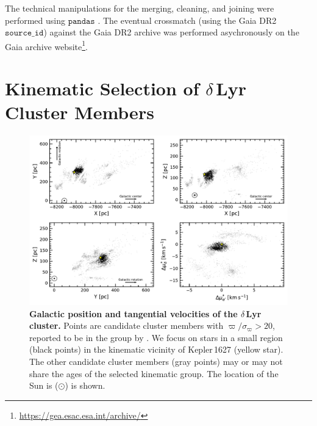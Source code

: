 \documentclass[12pt,modern,twocolumn,tighten]{aastex63}
\begin{document}
The technical manipulations for the merging, cleaning, and joining
were performed using $\texttt{pandas}$
\citep{mckinney-proc-scipy-2010}.  The eventual crossmatch (using the
Gaia DR2 $\texttt{source\_id}$) against the Gaia DR2 archive was performed
asychronously on the Gaia archive
website\footnote{\url{https://gea.esac.esa.int/archive/}}.


\section{Kinematic Selection of $\delta$\,Lyr Cluster Members}
\label{app:kinematicselection}

\begin{figure}[t]
	\begin{center}
		\leavevmode
		\includegraphics[width=1\textwidth]{f1.pdf}
	\end{center}
	\vspace{-0.7cm}
	\caption{
    {\bf Galactic position and tangential velocities of the
    $\delta$\,Lyr cluster.}
    Points are candidate cluster members with $\varpi/\sigma_\varpi >
    20$, reported to be in the group by
    \citet{kounkel_untangling_2019}.  We focus on stars in a small
    region (black points) in the kinematic vicinity of Kepler\,1627
    (yellow star).  The other candidate cluster members (gray points)
    may or may not share the ages of the selected kinematic group.
    The location of the Sun is ($\odot$) is shown.
		\label{fig:XYZvtang}
	}
\end{figure}
\end{document}
